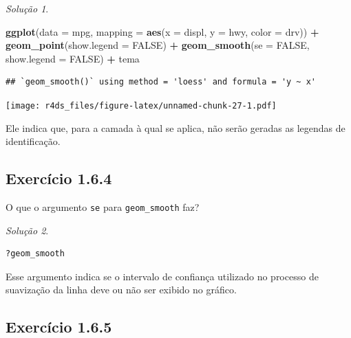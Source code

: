 \documentclass[
]{latex/krantz}
\newenvironment{Shaded}{\begin{snugshade}}{\end{snugshade}}
\newcommand{\AttributeTok}[1]{\textcolor[rgb]{0.13,0.29,0.53}{#1}}
\newcommand{\ConstantTok}[1]{\textcolor[rgb]{0.56,0.35,0.01}{#1}}
\newcommand{\FunctionTok}[1]{\textcolor[rgb]{0.13,0.29,0.53}{\textbf{#1}}}
\newcommand{\NormalTok}[1]{#1}
\newcommand{\SpecialCharTok}[1]{\textcolor[rgb]{0.81,0.36,0.00}{\textbf{#1}}}
\theoremstyle{definition}
\theoremstyle{definition}
\theoremstyle{definition}
\theoremstyle{definition}
\theoremstyle{remark}
\newtheorem*{solution}{Solução}
\begin{document}
\begin{solution}
\leavevmode

\begin{Shaded}
\begin{Highlighting}[]
\FunctionTok{ggplot}\NormalTok{(}\AttributeTok{data =}\NormalTok{ mpg, }\AttributeTok{mapping =} \FunctionTok{aes}\NormalTok{(}\AttributeTok{x =}\NormalTok{ displ, }\AttributeTok{y =}\NormalTok{ hwy, }\AttributeTok{color =}\NormalTok{ drv)) }\SpecialCharTok{+}
    \FunctionTok{geom\_point}\NormalTok{(}\AttributeTok{show.legend =} \ConstantTok{FALSE}\NormalTok{) }\SpecialCharTok{+}
    \FunctionTok{geom\_smooth}\NormalTok{(}\AttributeTok{se =} \ConstantTok{FALSE}\NormalTok{, }\AttributeTok{show.legend =} \ConstantTok{FALSE}\NormalTok{) }\SpecialCharTok{+}
\NormalTok{    tema}
\end{Highlighting}
\end{Shaded}

\begin{verbatim}
## `geom_smooth()` using method = 'loess' and formula = 'y ~ x'
\end{verbatim}

\texttt{[image: r4ds\_files/figure-latex/unnamed-chunk-27-1.pdf]}

Ele indica que, para a camada à qual se aplica, não serão geradas as legendas de identificação.

\end{solution}

\hypertarget{exr1-6-4}{%
\subsection*{Exercício 1.6.4}\label{exr1-6-4}}

O que o argumento \texttt{se} para \texttt{geom\_smooth} faz?

\begin{solution}
\leavevmode

\begin{verbatim}
?geom_smooth
\end{verbatim}

Esse argumento indica se o intervalo de confiança utilizado no processo de suavização da linha deve ou não ser exibido no gráfico.

\end{solution}

\hypertarget{exr1-6-5}{%
\subsection*{Exercício 1.6.5}\label{exr1-6-5}}
\end{document}
